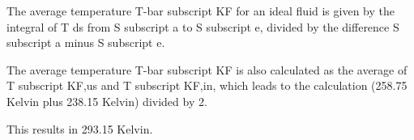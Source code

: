 The average temperature T-bar subscript KF for an ideal fluid is given by the integral of T ds from S subscript a to S subscript e, divided by the difference S subscript a minus S subscript e. 

The average temperature T-bar subscript KF is also calculated as the average of T subscript KF,us and T subscript KF,in, which leads to the calculation (258.75 Kelvin plus 238.15 Kelvin) divided by 2.

This results in 293.15 Kelvin.
